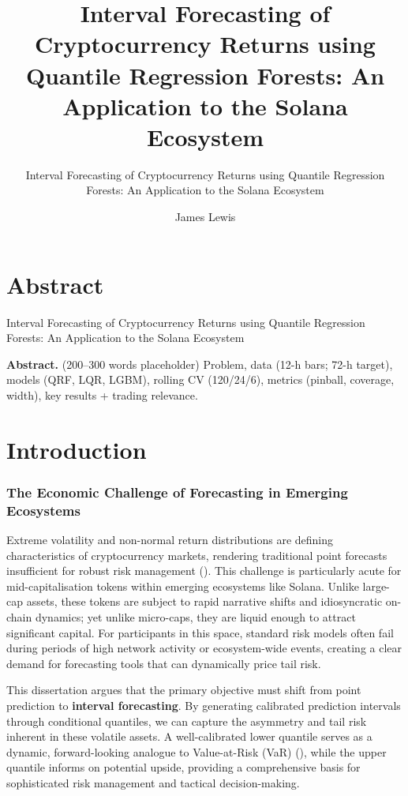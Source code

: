 \documentclass[
  a4paper,
  DIV=11,
  numbers=noendperiod]{scrreprt}
\title{Interval Forecasting of Cryptocurrency Returns using Quantile
Regression Forests: An Application to the Solana Ecosystem}
\subtitle{Interval Forecasting of Cryptocurrency Returns using Quantile
Regression Forests: An Application to the Solana Ecosystem}
\author{James Lewis}
\date{}
\renewcommand*\contentsname{Table of contents}
\newcommand\contentsname{Table of contents}
\begin{document}
\maketitle

\renewcommand*\contentsname{Table of contents}
{
\hypersetup{linkcolor=}
\setcounter{tocdepth}{2}
\tableofcontents
}


\chapter{Abstract}\label{abstract}

Interval Forecasting of Cryptocurrency Returns using Quantile Regression
Forests: An Application to the Solana Ecosystem

\hfill\break

\textbf{Abstract.} (200--300 words placeholder) Problem, data (12-h
bars; 72-h target), models (QRF, LQR, LGBM), rolling CV (120/24/6),
metrics (pinball, coverage, width), key results + trading relevance.


\chapter{Introduction}\label{introduction}

\subsection{The Economic Challenge of Forecasting in Emerging
Ecosystems}\label{the-economic-challenge-of-forecasting-in-emerging-ecosystems}

Extreme volatility and non-normal return distributions are defining
characteristics of cryptocurrency markets, rendering traditional point
forecasts insufficient for robust risk management
(). This
challenge is particularly acute for mid-capitalisation tokens within
emerging ecosystems like Solana. Unlike large-cap assets, these tokens
are subject to rapid narrative shifts and idiosyncratic on-chain
dynamics; yet unlike micro-caps, they are liquid enough to attract
significant capital. For participants in this space, standard risk
models often fail during periods of high network activity or
ecosystem-wide events, creating a clear demand for forecasting tools
that can dynamically price tail risk.

This dissertation argues that the primary objective must shift from
point prediction to \textbf{interval forecasting}. By generating
calibrated prediction intervals through conditional quantiles, we can
capture the asymmetry and tail risk inherent in these volatile assets. A
well-calibrated lower quantile serves as a dynamic, forward-looking
analogue to Value-at-Risk (VaR) (), while the upper quantile informs on potential
upside, providing a comprehensive basis for sophisticated risk
management and tactical decision-making.
\end{document}
